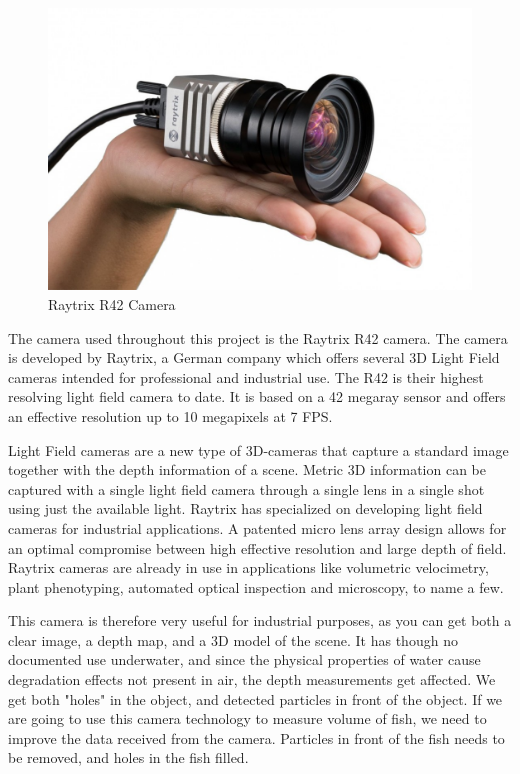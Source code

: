 \begin{figure}[h]
    \centering
    \includegraphics[width=.9\linewidth]{Images/raytrix_camera}
    \caption{Raytrix R42 Camera}
    \label{fig:raytrix_camera}
\end{figure}

The camera used throughout this project is the Raytrix R42 camera. The camera is developed by Raytrix, a German company which offers several 3D Light Field cameras intended for professional and industrial use. The R42 is their highest resolving light field camera to date. It is based on a 42 megaray sensor and offers an effective resolution up to 10 megapixels at 7 FPS. \cite{website:raytrix_r42}

Light Field cameras are a new type of 3D-cameras that capture a standard image together with the depth information of a scene. Metric 3D information can be captured with a single light field camera through a single lens in a single shot using just the available light. Raytrix has specialized on developing light field cameras for industrial applications. A patented micro lens array design allows for an optimal compromise between high effective resolution and large depth of field. Raytrix cameras are already in use in applications like volumetric velocimetry, plant phenotyping, automated optical inspection and microscopy, to name a few. \cite{website:raytrix_main}

This camera is therefore very useful for industrial purposes, as you can get both a clear image, a depth map, and a 3D model of the scene. It has though no documented use underwater, and since the physical properties of water cause degradation effects not present in air, the depth measurements get affected. We get both "holes" in the object, and detected particles in front of the object. If we are going to use this camera technology to measure volume of fish, we need to improve the data received from the camera. Particles in front of the fish needs to be removed, and holes in the fish filled.

